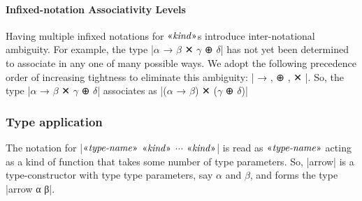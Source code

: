 \paragraph{Infixed-notation Associativity Levels}
Having multiple infixed notations for $\mvar{kind}$s introduce inter-notational ambiguity.
For example, the type \code|$α$ → $β$ ✕ $γ$ ⊕ $δ$| has not yet been determined to associate in any one of many possible ways.
We adopt the following precedence order of increasing tightness to eliminate this ambiguity: \code| → , ⊕ , ✕ |.
So, the type \code|$α$ → $β$ ✕ $γ$ ⊕ $δ$| associates as \code|($α$ → $β$) ✕ ($γ$ ⊕ $δ$)|

\subsubsection{Type application}
The notation for \code|$\mvar{type-name}$ $\mvar{kind}$ $\cdots$ $\mvar{kind}$| is read as $\mvar{type-name}$ acting as a kind of function that takes some number of type parameters.
So, \code|arrow| is a type-constructor with type type parameters, say $α$ and $β$, and forms the type \code|arrow α β|.
